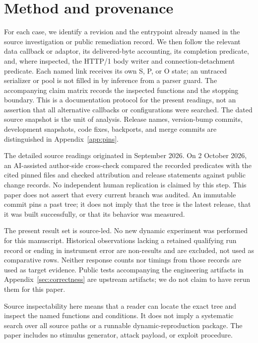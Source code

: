 \documentclass[11pt,letterpaper]{article}
\begin{document}
\section{Method and provenance}
For each case, we identify a revision and the entrypoint already named in the source investigation or public remediation record. We then follow the relevant data callback or adaptor, its delivered-byte accounting, its completion predicate, and, where inspected, the HTTP/1 body writer and connection-detachment predicate. Each named link receives its own S, P, or O state; an untraced serializer or pool is not filled in by inference from a parser guard. The accompanying claim matrix records the inspected functions and the stopping boundary. This is a documentation protocol for the present readings, not an assertion that all alternative callbacks or configurations were searched. The dated source snapshot is the unit of analysis. Release names, version-bump commits, development snapshots, code fixes, backports, and merge commits are distinguished in Appendix~\ref{app:pins}.

The detailed source readings originated in September 2026. On 2 October 2026, an AI-assisted author-side cross-check compared the recorded predicates with the cited pinned files and checked attribution and release statements against public change records. No independent human replication is claimed by this step. This paper does not assert that every current branch was audited. An immutable commit pins a past tree; it does not imply that the tree is the latest release, that it was built successfully, or that its behavior was measured.

The present result set is source-led. No new dynamic experiment was performed for this manuscript. Historical observations lacking a retained qualifying run record or ending in instrument error are non-results and are excluded, not used as comparative rows. Neither response counts nor timings from those records are used as target evidence. Public tests accompanying the engineering artifacts in Appendix~\ref{sec:correctness} are upstream artifacts; we do not claim to have rerun them for this paper.

Source inspectability here means that a reader can locate the exact tree and inspect the named functions and conditions. It does not imply a systematic search over all source paths or a runnable dynamic-reproduction package. The paper includes no stimulus generator, attack payload, or exploit procedure.
\end{document}

